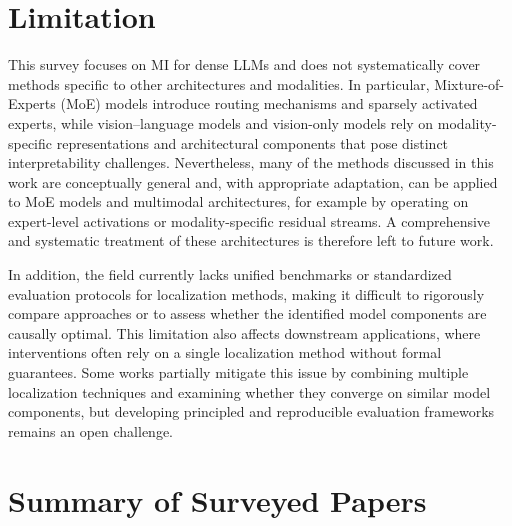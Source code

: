\documentclass[11pt,letterpaper]{mystyle}
\begin{document}
\section*{Limitation}
\label{sec:limitation}
This survey focuses on MI for dense LLMs and does not systematically cover methods specific to other architectures and modalities. In particular, Mixture-of-Experts (MoE) models introduce routing mechanisms and sparsely activated experts, while vision–language models and vision-only models rely on modality-specific representations and architectural components that pose distinct interpretability challenges. Nevertheless, many of the methods discussed in this work are conceptually general and, with appropriate adaptation, can be applied to MoE models and multimodal architectures, for example by operating on expert-level activations or modality-specific residual streams. A comprehensive and systematic treatment of these architectures is therefore left to future work.

In addition, the field currently lacks unified benchmarks or standardized evaluation protocols for localization methods, making it difficult to rigorously compare approaches or to assess whether the identified model components are causally optimal. This limitation also affects downstream applications, where interventions often rely on a single localization method without formal guarantees. Some works partially mitigate this issue by combining multiple localization techniques and examining whether they converge on similar model components, but developing principled and reproducible evaluation frameworks remains an open challenge.


\newpage
\onecolumn
\appendix

\newpage
\section{Summary of Surveyed Papers}
\label{app:paper_list}

\newcommand{\ObjStyle}[1]{\textcolor{colorObj}{\textbf{\texttt{\footnotesize #1}}}} 

\def\ObjToken{\ObjStyle{Token Embedding}}
\def\ObjRes{\ObjStyle{Residual Stream}}
\def\ObjAttn{\ObjStyle{MHA}}
\def\ObjFFN{\ObjStyle{FFN}}
\def\ObjNeuron{\ObjStyle{Neuron}}
\def\ObjSAE{\ObjStyle{SAE Feature}}

\newcommand{\LocStyle}[1]{\textcolor{colorLoc}{\textsf{\footnotesize #1}}}
\def\LocMag{\LocStyle{Magnitude Analysis}}
\def\LocCausal{\LocStyle{Causal Attribution}}
\def\LocGrad{\LocStyle{Gradient Detection}}
\def\LocProb{\LocStyle{Probing}}
\def\LocVocab{\LocStyle{Vocab Projection}}
\def\LocCirc{\LocStyle{Circuit Discovery}}
\end{document}
